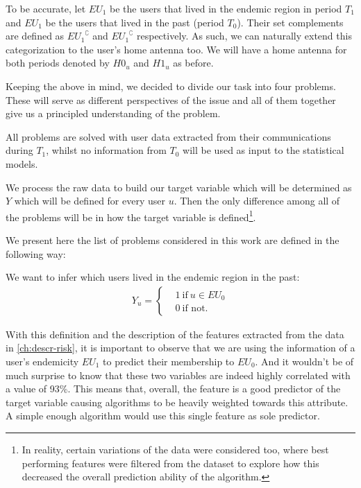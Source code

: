 To be accurate, let $EU_{1}$ be the users that lived in the endemic region in period $T_1$
and  $EU_{1}$ be the users that lived in the past (period $T_0$).
Their set complements are defined as ${ EU_1 }^{\complement}$ and ${ EU_1 }^{\complement}$ respectively.
As such, we can naturally extend this categorization to the user's home antenna too.
We will have a home antenna for both periods denoted by $H0_u$ and $H1_u$ as before.

Keeping the above in mind, we decided to divide our task into four problems.
These will serve as different perspectives of the issue and all of them together give us a principled understanding of the problem.

All problems are solved with user data extracted from their communications during $T_1$, whilst no information from $T_0$ will be used as input to the statistical models.

We process the raw data to build our target variable which will be determined as $Y$ which will be defined for every user $u$.
Then the only difference among all of the problems will be in how the target variable is defined\footnote{In reality, certain variations of the data were considered too, where best performing features were filtered from the dataset to explore how this decreased the overall prediction ability of the algorithm.}.


We present here the list of problems considered in this work are defined in the following way:



\begin{problem}\label{target1}
We want to infer which users lived in the endemic region in the past:
		\begin{align*}
		Y_u =
		\begin{cases}
		&1 \ \mbox{if} \ u \in EU_{0} \\
		&0 \ \mbox{if not}.
		\end{cases}
		\end{align*}
\end{problem}

With this definition and the description of the features extracted from the data in \cref{ch:descr-risk}, it is important to observe that we are using the information of a user's endemicity $EU_{1}$ to predict their membership to $EU_{0}$.
And it wouldn't be of much surprise to know that these two variables are indeed highly correlated with a value of 93\%.
This means that, overall, the feature is a good predictor of the target variable causing algorithms to be heavily weighted towards this attribute. A simple enough algorithm would use this single feature as sole predictor.


